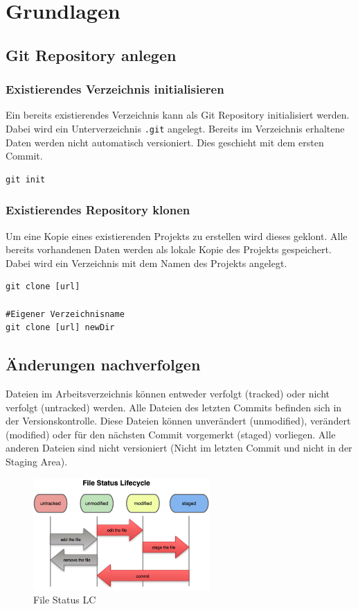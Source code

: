 \chapter{Grundlagen}
\section{Git Repository anlegen}
\subsection{Existierendes Verzeichnis initialisieren}
Ein bereits existierendes Verzeichnis kann als Git Repository initialisiert werden. Dabei wird ein Unterverzeichnis \texttt{.git} angelegt. Bereits im Verzeichnis erhaltene Daten werden nicht automatisch versioniert. Dies geschieht mit dem ersten Commit.\\
\begin{lstlisting}[caption={Initialisierung},captionpos=b]
git init
\end{lstlisting}
\subsection{Existierendes Repository klonen}
Um eine Kopie eines existierenden Projekts zu erstellen wird dieses geklont. Alle bereits vorhandenen Daten werden als lokale Kopie des Projekts gespeichert. Dabei wird ein Verzeichnis mit dem Namen des Projekts angelegt.\\
\begin{lstlisting}[caption={Clone},captionpos=b]
git clone [url]

#Eigener Verzeichnisname
git clone [url] newDir
\end{lstlisting}
\section{Änderungen nachverfolgen}
Dateien im Arbeitsverzeichnis können entweder verfolgt (tracked) oder nicht verfolgt (untracked) werden. Alle Dateien des letzten Commits befinden sich in der Versionskontrolle. Diese Dateien können unverändert (unmodified), verändert (modified) oder für den nächsten Commit vorgemerkt (staged) vorliegen. Alle anderen Dateien sind nicht versioniert (Nicht im letzten Commit und nicht in der Staging Area).
\begin{figure}[H]
	\centering
		\includegraphics[width=0.6\textwidth]{img/follow.png}
	\caption{File Status LC}
\end{figure}
